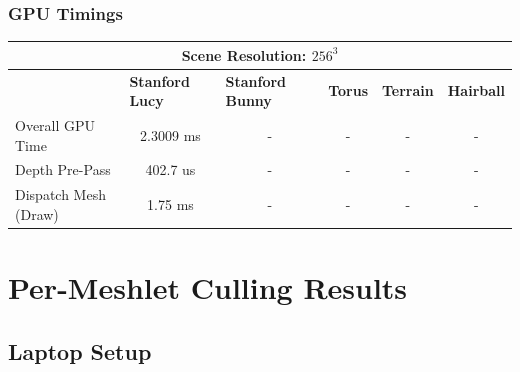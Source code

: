 \subsubsection*{GPU Timings}

\begin{table}[h]
    \begin{tabular}{|lccccc|}
    \hline
    \multicolumn{6}{|c|}{\textbf{Scene Resolution: $256^3$}}                                                                                                                                                                                                         \\ \hline
    \multicolumn{1}{|l|}{}                          & \multicolumn{1}{l|}{\textbf{Stanford Lucy}}   & \multicolumn{1}{l|}{\textbf{Stanford Bunny}}  & \multicolumn{1}{l|}{\textbf{Torus}}   & \multicolumn{1}{l|}{\textbf{Terrain}}     & \multicolumn{1}{l|}{\textbf{Hairball}}    \\ \hline
    \multicolumn{1}{|l|}{Overall GPU Time}          & \multicolumn{1}{c|}{2.3009 ms}                & \multicolumn{1}{c|}{-}                        & \multicolumn{1}{c|}{-}                & \multicolumn{1}{c|}{-}                    & \multicolumn{1}{c|}{-}                    \\
    \multicolumn{1}{|l|}{Depth Pre-Pass}            & \multicolumn{1}{c|}{402.7 us}                 & \multicolumn{1}{c|}{-}                        & \multicolumn{1}{c|}{-}                & \multicolumn{1}{c|}{-}                    & -                                         \\
    \multicolumn{1}{|l|}{Dispatch Mesh (Draw)}      & \multicolumn{1}{c|}{1.75 ms}                  & \multicolumn{1}{c|}{-}                        & \multicolumn{1}{c|}{-}                & \multicolumn{1}{c|}{-}                    & -                                         \\ \hline
    \end{tabular}
\end{table}





\section{Per-Meshlet Culling Results}

\subsection*{Laptop Setup}

